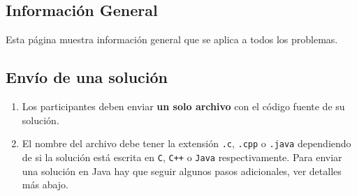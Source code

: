 \documentclass[12pt]{oci}
\begin{document}







\subsection*{Información General}

Esta página muestra información general que se aplica a todos los problemas.

\subsection*{Envío de una solución}

\begin{enumerate}
\item Los participantes deben enviar {\bf un solo archivo} con el código fuente de su solución.
\item El nombre del archivo debe tener la extensión \verb+.c+, \verb+.cpp+ o
  \verb+.java+ dependiendo de si la solución está escrita en \verb|C|,
  \verb|C++| o \verb|Java| respectivamente.
Para enviar una solución en Java hay que seguir algunos pasos adicionales, ver detalles más abajo.
\end{enumerate}
\end{document}
